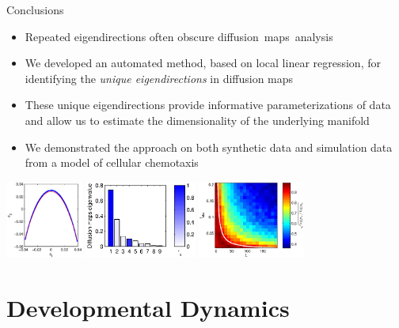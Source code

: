 \documentclass[12pt]{beamer}
\begin{document}
\begin{frame}{Conclusions}

\begin{itemize}
\item Repeated eigendirections often obscure diffusion~maps~analysis
\item We developed an automated method, based on local linear regression, for identifying the {\em unique eigendirections} in diffusion maps
\item These unique eigendirections provide informative parameterizations of data and allow us to estimate the dimensionality of the underlying manifold
\item We demonstrated the approach on both synthetic data and simulation data from a model of cellular chemotaxis
\end{itemize}

\vfill

\includegraphics[height=1in]{strip_corr_12_fitline}
\hfill
\includegraphics[height=1in]{strip_evals_color}
\hfill
\includegraphics[height=1in]{tmax_lambda_transition}

\end{frame}

\section{Developmental Dynamics}
\end{document}
